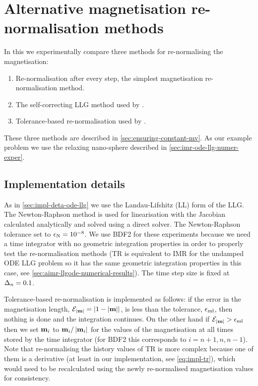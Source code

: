 
\FloatBarrier
\chapter{Alternative magnetisation re-normalisation methods}
\label{sec:magn-renorm-meth}

In this  we experimentally compare three methods for re-normalising the magnetisation:
\begin{enumerate}
\item Re-normalisation after every step, the simplest magnetisation re-normalisation method.
\item The self-correcting LLG method used by \nmag.
\item Tolerance-based re-normalisation used by \magpar.
\end{enumerate}
These three methods are described in \cref{sec:ensuring-constant-mv}.
As our example problem we use the relaxing nano-sphere described in \cref{sec:imr-ode-llg-numer-exper}.

\section{Implementation details}

As in \cref{sec:impl-deta-ode-llg} we use the Landau-Lifshitz (LL) form of the LLG.
The Newton-Raphson method is used for linearisation with the Jacobian calculated analytically and solved using a direct solver.
The Newton-Raphson tolerance set to $\epsilon_{\mathrm{N}} = 10^{-8}$.
We use BDF2 for these experiments because we need a time integrator with no geometric integration properties in order to properly test the re-normalisation methods (TR is equivalent to IMR for the undamped ODE LLG problem so it has the same geometric integration properties in this case, see \cref{sec:aimr-llgode-numerical-results}).
The time step size is fixed at $\Delta_{n} = 0.1$.

Tolerance-based re-normalisation is implemented as follows:
if the error in the magnetisation length, $\mathcal{E}_{\left|{\boldsymbol{\mathrm{m}}} \right|} = \left|{1 - \left|{\boldsymbol{\mathrm{m}}} \right|} \right|$, is less than the tolerance, $\epsilon_{\mathrm{ml}}$, then nothing is done and the integration continues.
On the other hand if $\mathcal{E}_{\left|{\boldsymbol{\mathrm{m}}} \right|} > \epsilon_{\mathrm{ml}}$ then we set $\boldsymbol{\mathrm{m}}_{i}$ to $\boldsymbol{\mathrm{m}}_{i}/\left|{\boldsymbol{\mathrm{m}}_{i}} \right|$ for the values of the magnetisation at all times stored by the time integrator (for BDF2 this corresponds to $i=n+1, n, n-1$).
Note that re-normalising the history values of TR is more complex because one of them is a derivative (at least in our implementation, see \cref{eq:impl-tr}), which would need to be recalculated using the newly re-normalised magnetisation values for consistency.


